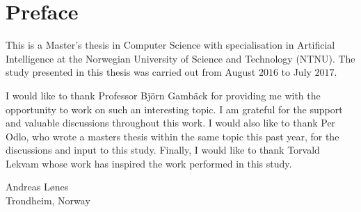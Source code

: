 \cleardoublepage
\chapter{Preface}


This is a Master's thesis in Computer Science with specialisation in Artificial Intelligence at the Norwegian University of Science and Technology (NTNU). The study presented in this thesis was carried out from August $2016$ to July $2017$.

I would like to thank Professor Bj\"orn Gamb\"ack for providing me with the opportunity to work on such an interesting topic. I am grateful for the support and valuable discussions throughout this work. I would also like to thank Per Odlo, who wrote a masters thesis within the same topic this past year, for the discussions and input to this study. Finally, I would like to thank Torvald Lekvam whose work has inspired the work performed in this study.


\vspace{1.0cm}
\begin{flushright}
    Andreas Lønes      \\
    Trondheim, Norway \\
    \month~\year    \\
\end{flushright}